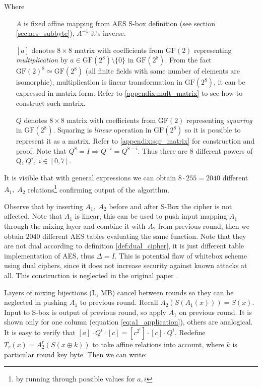 \documentclass[11pt,oneside,final]{fithesis2}
\newcommand{\gfe}{\ensuremath{\text{GF}\left(2^8\right)}}
\newcommand{\gf}{\ensuremath{\text{GF}\left(2\right)}}
\begin{document}
	Where
	\begin{itemize}[leftmargin=5em]
	 \item[{$A$}] is fixed affine mapping from AES S-box definition (see section \ref{sec:aes_subbyte}), $A^{-1}$ it's inverse.
	 \item[{$[a]$}] denotes $8 \times 8$ matrix with coefficients from $\gf$ representing \emph{multiplication} by $a \in \gfe \setminus \{0\}$ in $\gfe$. 
	    From the fact $\gf^8 \simeq \gfe$ (all finite fields with same number of elements are isomorphic), multiplication is
	    linear transformation in $\gfe$, it can be expressed in matrix form. Refer to \ref{appendix:mult_matrix} to see how to construct such matrix.
	 \item[{$Q$}] denotes $8 \times 8$ matrix with coefficients from $\gf$ representing \emph{squaring} in $\gfe$. Squaring is \emph{linear} operation
	    in $\gfe$ so it is possible to represent it as a matrix. Refer to \ref{appendix:sqr_matrix} for construction and proof. Note that 
	    $Q^8 = I \Rightarrow Q^{-i} = Q^{8-i}$. Thus there are 8 different powers of Q, $Q^{i}, \; i \in [0,7]$.
	\end{itemize}
	
	It is visible that with general expressions we can obtain $8 \cdot 255 = 2040$ different 
	$A_1,\;A_2$ relations\footnote{by running through possible values for $a,i$ } confirming output of the algorithm. 
	
	Observe that by inserting $A_1,\;A_2$ before and after S-Box the cipher is not affected. Note that $A_1$ is linear, this can be used to 
	push input mapping $A_1$ through the mixing layer and combine it with $A_2$ from previous round, then we obtain $2040$ different AES 
	tables evaluating the same function. Note that they are not dual according to definition \ref{def:dual_cipher}, it is just different 
	table implementation of AES, thus $\Delta = I$. This is potential flaw of whitebox scheme using dual ciphers, since it does not increase
	security against known attacks at all. This construction is neglected in the original paper \citep{Karroumi:2010:PWA:2041036.2041060}.
	
	Layers of mixing bijections (L, MB) cancel between rounds so they can be neglected in pushing $A_1$ to previous round. 
	Recall $A_2\left(S\left(A_1\left(x\right)\right)\right) = S(x)$. Input to S-box is output of previous round, so apply $A_1$ on previous round.
	It is shown only for one column (equation \ref{eq:a1_application}), others are analogical. It is easy to verify that 
	$\left[a\right] \cdot Q^i \cdot \left[c\right] = \left[c^{2^{i}}\right] \cdot \left[c\right] \cdot Q^i$. 
	Redefine $T_r(x) = A_2^r(S(x \oplus k))$ to take affine relations into account, where $k$ is particular round key byte. Then we can write:
\end{document}
